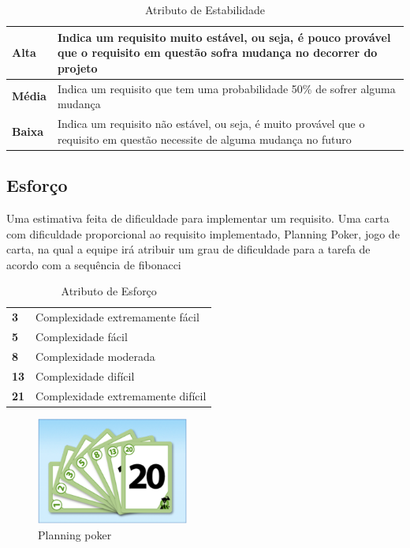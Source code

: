   \begin{table}[!htb]
    \centering
    \begin{tabular}{p{5cm}p{10cm}}
      \toprule
      \textbf{Alta}  & Indica um requisito muito estável, ou seja, é pouco provável que o requisito em questão sofra
                       mudança no decorrer do projeto                                                                       \\ \midrule
      \textbf{Média} & Indica um requisito que tem uma probabilidade 50\% de sofrer alguma mudança                          \\ \midrule
      \textbf{Baixa} & Indica um requisito não estável, ou seja, é muito provável que o requisito em questão necessite
                       de alguma mudança no futuro                                                                          \\
      \bottomrule
    \end{tabular}
    \caption{Atributo de Estabilidade}
  \end{table}

\subsection{Esforço}

	Uma estimativa feita de dificuldade para implementar um requisito. Uma carta com dificuldade proporcional ao requisito implementado,
  Planning Poker, jogo de carta, na qual a equipe irá atribuir um grau de dificuldade para a tarefa de acordo com a sequência de
  fibonacci

  \begin{table}[!htb]
    \centering
    \begin{tabular}{p{5cm}p{10cm}}
      \toprule
      \textbf{3}  & Complexidade extremamente fácil   \\
      \textbf{5}  & Complexidade fácil                \\
      \textbf{8}  & Complexidade moderada             \\
      \textbf{13} & Complexidade difícil              \\
      \textbf{21} & Complexidade extremamente difícil \\
      \bottomrule
    \end{tabular}
    \caption{Atributo de Esforço}
  \end{table}

  \begin{figure}[!htb]
  		\centering
		\includegraphics[width=5cm]{figuras/gerenciamento/planning_poker.eps}
		\caption{Planning poker}
	\end{figure}

